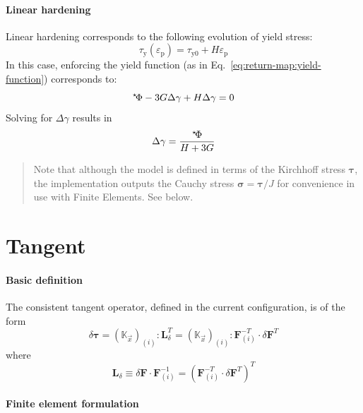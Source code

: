 \documentclass[garamond]{goose-article}
\newcommand\ST[1]{\hspace*{-.3em}~^\star\!#1}
\newcommand\T[1]{\bm{{#1}}}
\newcommand\TT[1]{\mathbb{{#1}}}
\begin{document}
\paragraph{Linear hardening}

Linear hardening corresponds to the following evolution of yield stress:
\begin{equation}
  \tau_\mathrm{y} ( \varepsilon_\mathrm{p} ) = \tau_\mathrm{y0} + H \varepsilon_\mathrm{p}
\end{equation}
In this case, enforcing the yield function (as in Eq.~\eqref{eq:return-map:yield-function}) corresponds to:
\begin{equation}
  \ST{\Phi} - 3 G \Delta \gamma + H \Delta \gamma = 0
\end{equation}
Solving for $\Delta \gamma$ results in
\begin{equation}
  \Delta \gamma = \frac{\ST{\Phi}}{H + 3G}
\end{equation}

\begin{framed}
\begin{quote}
  Note that although the model is defined in terms of the Kirchhoff stress $\T{\tau}$, the implementation outputs the Cauchy stress $\T{\sigma} = \T{\tau} / J$ for convenience in use with Finite Elements. See below.
\end{quote}
\end{framed}

\section{Tangent}

\paragraph{Basic definition}

The consistent tangent operator, defined in the current configuration, is of the form
%
\begin{equation}
  \delta \bm{\tau}
  =
  (\TT{K}_{\vec{x}})_{(i)}
  : \T{L}_\delta^T
  =
  (\TT{K}_{\vec{x}})_{(i)}
  : \T{F}_{(i)}^{-T} \cdot \delta \T{F}^T
  \label{eq:tangent}
\end{equation}
where
\begin{equation}
  \bm{L}_\delta
  \equiv \delta \bm{F} \cdot \bm{F}_{(i)}^{-1}
  = \left( \bm{F}_{(i)}^{-T} \cdot \delta \bm{F}^T \right)^T
\end{equation}

\paragraph{Finite element formulation}
\end{document}
